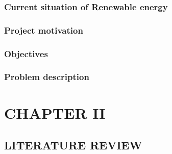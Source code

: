 \documentclass{article}
\begin{document}
\subsubsection*{\fontsize{12}{14} Current situation of Renewable energy}


\subsubsection*{\fontsize{12}{14} Project motivation}


\subsubsection*{\fontsize{12}{14} Objectives}


\subsubsection*{\fontsize{12}{14} Problem description}
\cite{ref7}
\cite{ref8}
\cite{ref9}
\cite{ref10}\cite{ref12}\cite{ref13}\cite{ref14}\cite{ref15}\cite{ref16}\cite{ref17}\cite{ref18}\cite{ref19}\cite{ref20}\cite{ref21}\cite{ref22}\cite{ref23}\cite{ref24}\cite{ref25}\cite{ref26}\cite{ref27}\cite{ref28}
\clearpage




\section*{\centering\fontsize{14}{16}\selectfont CHAPTER II}

\subsection*{\centering\fontsize{12}{14}\selectfont LITERATURE REVIEW}
\vspace{3\baselineskip}
\end{document}
